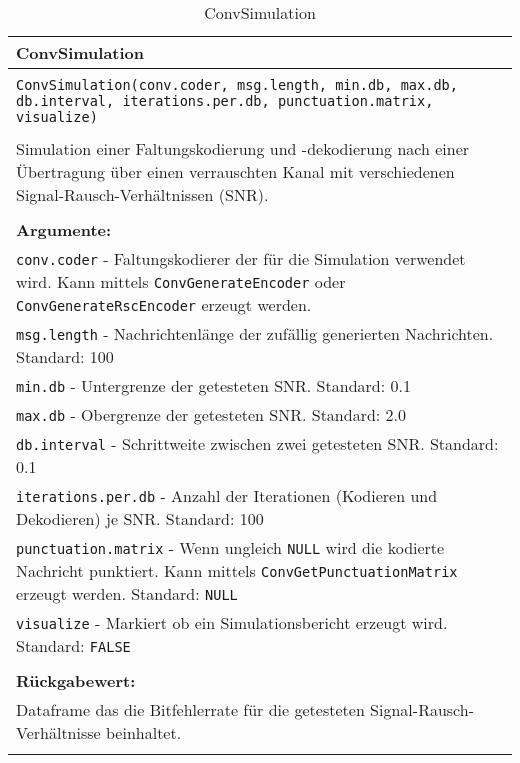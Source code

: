 \begin{longtable}{|p{\textwidth}|}
\hline
\rowcolor{lightblue}
ConvSimulation
\\
\hline
\\
\texttt{ConvSimulation(conv.coder, msg.length, min.db, max.db, db.interval, iterations.per.db, punctuation.matrix, visualize)}\\
\\
Simulation einer Faltungskodierung und -dekodierung nach einer Übertragung über einen verrauschten Kanal mit verschiedenen Signal-Rausch-Verhältnissen (SNR).\\
\\
\textbf{Argumente:}\\
\texttt{conv.coder} - Faltungskodierer der für die Simulation verwendet wird. Kann mittels \texttt{ConvGenerateEncoder} oder \texttt{ConvGenerateRscEncoder} erzeugt werden.\\
\texttt{msg.length} - Nachrichtenlänge der zufällig generierten Nachrichten. Standard: 100\\
\texttt{min.db} - Untergrenze der getesteten SNR. Standard: 0.1\\
\texttt{max.db} - Obergrenze der getesteten SNR. Standard: 2.0\\
\texttt{db.interval} - Schrittweite zwischen zwei getesteten SNR. Standard: 0.1\\
\texttt{iterations.per.db} - Anzahl der Iterationen (Kodieren und Dekodieren) je SNR. Standard: 100\\
\texttt{punctuation.matrix} - Wenn ungleich \texttt{NULL} wird die kodierte Nachricht punktiert. Kann mittels \texttt{ConvGetPunctuationMatrix} erzeugt werden. Standard: \texttt{NULL}\\
\texttt{visualize} - Markiert ob ein Simulationsbericht erzeugt wird. Standard: \texttt{FALSE}\\
\\
\textbf{Rückgabewert:}\\
Dataframe das die Bitfehlerrate für die getesteten Signal-Rausch-Verhältnisse beinhaltet.
\\
\hline
\caption{ConvSimulation}
\label{funktion:ConvSimulation}
\end{longtable}